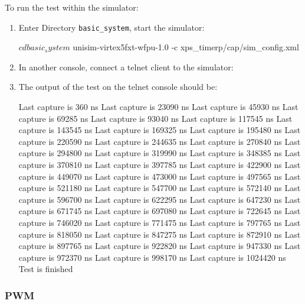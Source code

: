\noindent To run the test within the simulator:
\begin{enumerate}
\item Enter Directory \texttt{basic\_system}, start the simulator:
\begin{script}
$ cd basic_system
$ unisim-virtex5fxt-wfpu-1.0 -c xps_timerp/cap/sim_config.xml
\end{script}
\item In another console, connect a telnet client to the simulator:
\item The output of the test on the telnet console should be:
\begin{script}
Last capture is 360 ns
Last capture is 23090 ns
Last capture is 45930 ns
Last capture is 69285 ns
Last capture is 93040 ns
Last capture is 117545 ns
Last capture is 143545 ns
Last capture is 169325 ns
Last capture is 195480 ns
Last capture is 220590 ns
Last capture is 244635 ns
Last capture is 270840 ns
Last capture is 294800 ns
Last capture is 319990 ns
Last capture is 348385 ns
Last capture is 370810 ns
Last capture is 397785 ns
Last capture is 422900 ns
Last capture is 449070 ns
Last capture is 473000 ns
Last capture is 497565 ns
Last capture is 521180 ns
Last capture is 547700 ns
Last capture is 572140 ns
Last capture is 596700 ns
Last capture is 622295 ns
Last capture is 647230 ns
Last capture is 671745 ns
Last capture is 697080 ns
Last capture is 722645 ns
Last capture is 746020 ns
Last capture is 771475 ns
Last capture is 797765 ns
Last capture is 818050 ns
Last capture is 847275 ns
Last capture is 872910 ns
Last capture is 897765 ns
Last capture is 922820 ns
Last capture is 947330 ns
Last capture is 972370 ns
Last capture is 998170 ns
Last capture is 1024420 ns
Test is finished
\end{script}
\end{enumerate}

\subsubsection{PWM}

